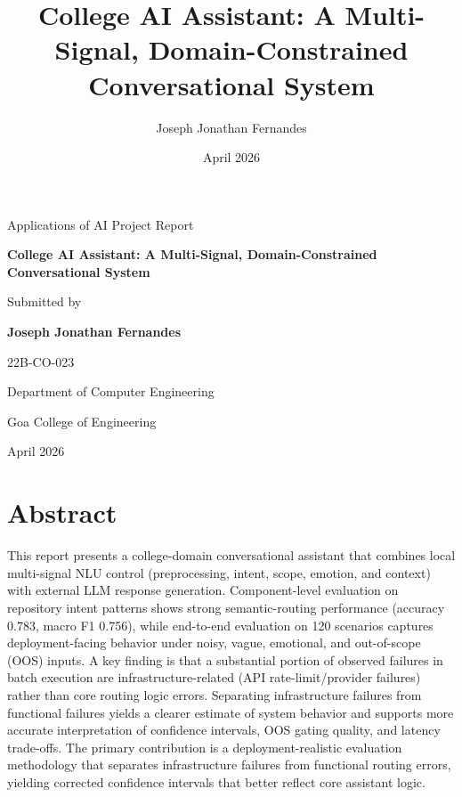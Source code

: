 \documentclass[12pt,onecolumn]{report}
\title{College AI Assistant: A Multi-Signal, Domain-Constrained Conversational System}
\author{Joseph Jonathan Fernandes}
\date{April 2026}
\begin{document}
\begin{titlepage}
	\centering
	\vspace*{1.5cm}
	{\Large Applications of AI Project Report\par}
	\vspace{1.2cm}
	{\LARGE\bfseries College AI Assistant: A Multi-Signal, Domain-Constrained Conversational System\par}
	\vspace{1.6cm}
	{\large Submitted by\par}
	\vspace{0.4cm}
	{\Large\bfseries Joseph Jonathan Fernandes\par}
	\vspace{0.4cm}
	{\large 22B-CO-023\par}
	\vfill
	{\large Department of Computer Engineering\par}
	{\large Goa College of Engineering \par}
	{\large April 2026\par}
\end{titlepage}


\chapter*{Abstract}
This report presents a college-domain conversational assistant that combines local multi-signal NLU control (preprocessing, intent, scope, emotion, and context) with external LLM response generation. Component-level evaluation on repository intent patterns shows strong semantic-routing performance (accuracy 0.783, macro F1 0.756), while end-to-end evaluation on 120 scenarios captures deployment-facing behavior under noisy, vague, emotional, and out-of-scope (OOS) inputs. A key finding is that a substantial portion of observed failures in batch execution are infrastructure-related (API rate-limit/provider failures) rather than core routing logic errors. Separating infrastructure failures from functional failures yields a clearer estimate of system behavior and supports more accurate interpretation of confidence intervals, OOS gating quality, and latency trade-offs.
The primary contribution is a deployment-realistic evaluation methodology that separates infrastructure failures from functional routing errors, yielding corrected confidence intervals that better reflect core assistant logic.

\clearpage
\tableofcontents
\clearpage
\listoffigures
\clearpage
\listoftables
\clearpage
\end{document}
